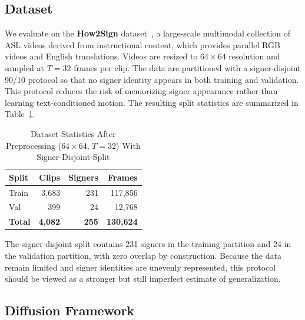\documentclass{ieeeaccess}
\begin{document}
\subsection{Dataset}
\label{subsec:dataset}

We evaluate on the \textbf{How2Sign} dataset~\cite{duarte2021how2sign}, a large-scale multimodal collection of ASL videos derived from instructional content, which provides parallel RGB videos and English translations. Videos are resized to $64 \times 64$ resolution and sampled at $T = 32$ frames per clip. The data are partitioned with a signer-disjoint 90/10 protocol so that no signer identity appears in both training and validation. This protocol reduces the risk of memorizing signer appearance rather than learning text-conditioned motion. The resulting split statistics are summarized in Table~\ref{tab:dataset_stats}.

\begin{table}[H]
    \centering
    \caption{Dataset Statistics After Preprocessing ($64\times64$, $T=32$) With Signer-Disjoint Split}
    \label{tab:dataset_stats}
    \renewcommand{\arraystretch}{1.15}
    \begin{tabular}{@{} l r r r @{}}
        \toprule
        \rowcolor{tableheader}
        \textbf{Split} & \textbf{Clips} & \textbf{Signers} & \textbf{Frames} \\
        \midrule
        \rowcolor{tablerow1}
        Train  & 3,683 & 231 & 117,856 \\
        \rowcolor{tablerow2}
        Val    & 399   & 24  & 12,768 \\
        \midrule
        \rowcolor{tablerow1}
        \textbf{Total}  & \textbf{4,082} & \textbf{255} & \textbf{130,624} \\
        \bottomrule
    \end{tabular}
\end{table}

    The signer-disjoint split contains 231 signers in the training partition and 24 in the validation partition, with zero overlap by construction. Because the data remain limited and signer identities are unevenly represented, this protocol should be viewed as a stronger but still imperfect estimate of generalization.

\subsection{Diffusion Framework}
\label{subsec:background_diffusion}
\end{document}
